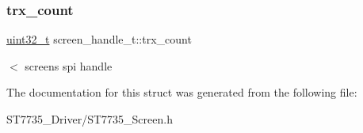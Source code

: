 \subsubsection{\texorpdfstring{trx\+\_\+count}{trx\_count}}
{\footnotesize\ttfamily \hyperlink{vl53l0x__types_8h_a435d1572bf3f880d55459d9805097f62}{uint32\+\_\+t} screen\+\_\+handle\+\_\+t\+::trx\+\_\+count}

$<$ screen\textquotesingle{}s spi handle 

The documentation for this struct was generated from the following file\+:\begin{DoxyCompactItemize}
\item 
S\+T7735\+\_\+\+Driver/S\+T7735\+\_\+\+Screen.\+h\end{DoxyCompactItemize}
